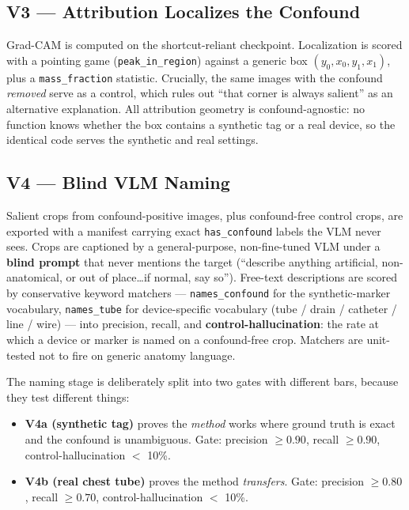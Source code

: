 \documentclass{ieeeaccess}
\begin{document}
\subsection{V3 --- Attribution Localizes the Confound}
Grad-CAM is computed on the shortcut-reliant checkpoint. Localization is scored with a pointing game (\texttt{peak\_in\_region}) against a generic box $(y_0, x_0, y_1, x_1)$, plus a \texttt{mass\_fraction} statistic. Crucially, the same images with the confound \emph{removed} serve as a control, which rules out ``that corner is always salient'' as an alternative explanation. All attribution geometry is confound-agnostic: no function knows whether the box contains a synthetic tag or a real device, so the identical code serves the synthetic and real settings.

\subsection{V4 --- Blind VLM Naming}
Salient crops from confound-positive images, plus confound-free control crops, are exported with a manifest carrying exact \texttt{has\_confound} labels the VLM never sees. Crops are captioned by a general-purpose, non-fine-tuned VLM under a \textbf{blind prompt} that never mentions the target (``describe anything artificial, non-anatomical, or out of place\ldots if normal, say so''). Free-text descriptions are scored by conservative keyword matchers --- \texttt{names\_confound} for the synthetic-marker vocabulary, \texttt{names\_tube} for device-specific vocabulary (tube / drain / catheter / line / wire) --- into precision, recall, and \textbf{control-hallucination}: the rate at which a device or marker is named on a confound-free crop. Matchers are unit-tested not to fire on generic anatomy language.

The naming stage is deliberately split into two gates with different bars, because they test different things:
\begin{itemize}
\item \textbf{V4a (synthetic tag)} proves the \emph{method} works where ground truth is exact and the confound is unambiguous. Gate: precision $\geq 0.90$, recall $\geq 0.90$, control-hallucination $<$ 10\%.
\item \textbf{V4b (real chest tube)} proves the method \emph{transfers}. Gate: precision $\geq 0.80$, recall $\geq 0.70$, control-hallucination $<$ 10\%.
\end{itemize}
\end{document}
